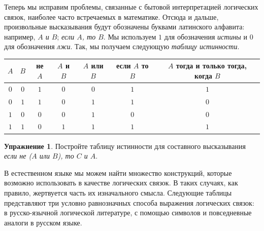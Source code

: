 \documentclass[12pt,notitlepage]{article}
\theoremstyle{plain}
\theoremstyle{definition}
\newtheorem{exc}[thm]{Упражнение}
\theoremstyle{plain}
\newcommand{\1}{\mathbf{1}}
\newcommand{\0}{\mathbf{0}}
\begin{document}
Теперь мы исправим проблемы, связанные с бытовой интерпретацией логических связок, наиболее часто встречаемых в математике. Отсюда и дальше, произвольные высказывания будут обозначены буквами латинского алфавита: например, \emph{$A$ и $B$}; \emph{если $A$, то $B$}. Мы используем $1$ для обозначения \emph{истины} и $0$ для обозначения \emph{лжи}. Так, мы получаем следующую \emph{таблицу истинности}.
\begin{center}
	\begin{tabular}{| c c | c | c | c | c | c |}
		\hline
		$A$ & $B$ & не $A$  &$A$ и $B$&$A$ или $B$&если $A$ то $B$ &$A$ тогда и только тогда, когда $B$\\
		\hline
		$0$&$0$&$1$&$0$&$0$&$1$&$1$\\
		$0$&$1$&$1$&$0$&$1$&$1$&$0$\\
		$1$&$0$&$0$&$0$&$1$&$0$&$0$\\
		$1$&$1$&$0$&$1$&$1$&$1$&$1$\\
		\hline
	\end{tabular}
\end{center}
\begin{exc}
	Постройте таблицу истинности для составного высказывания \emph{если не ($A$ или $B$), то $C$ и $A$}.
\end{exc}

В естественном языке мы можем найти множество конструкций, которые возможно использовать в качестве логических связок. В таких случаях, как правило, жертвуется часть их изначального смысла. Следующие таблицы представляют три условно равнозначных способа выражения логических связок: в русско-язычной логической литературе, с помощью символов и повседневные аналоги в русском языке.
\end{document}
